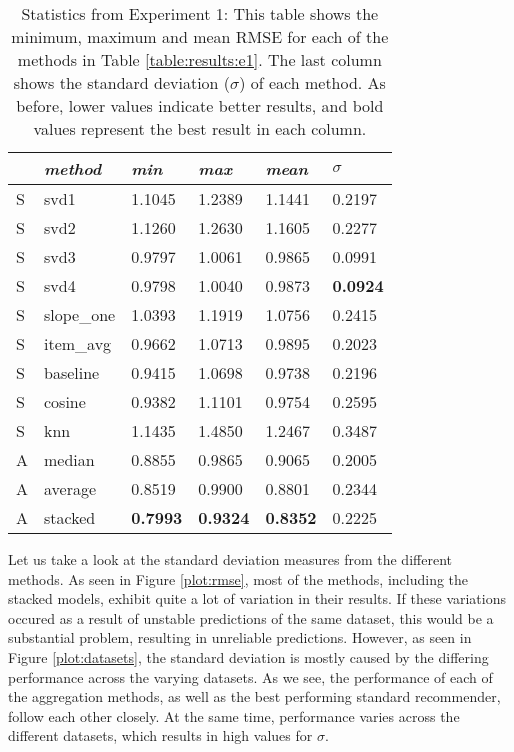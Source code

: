 \begin{table}
  \begin{tabular*}{\textwidth}{ l p{3cm} p{2cm} p{2cm} p{2cm} p{2cm} }
    \toprule
      ~ & \emph{method} & 
      \emph{min} & \emph{max} & \emph{mean} & $\sigma$\\
    \midrule
    S & svd1          & 1.1045	& 1.2389	& 1.1441	& 0.2197 \\
    S & svd2          & 1.1260	& 1.2630	& 1.1605	& 0.2277 \\
    S & svd3          & 0.9797	& 1.0061	& 0.9865	& 0.0991 \\
    S & svd4          & 0.9798	& 1.0040	& 0.9873	& \textbf{0.0924} \\
    S & slope\_one    & 1.0393	& 1.1919	& 1.0756	& 0.2415 \\
    S & item\_avg     & 0.9662	& 1.0713	& 0.9895	& 0.2023 \\
    S & baseline       & 0.9415	& 1.0698	& 0.9738	& 0.2196 \\
    S & cosine   	    & 0.9382	& 1.1101	& 0.9754	& 0.2595 \\
    S & knn       	  & 1.1435	& 1.4850	& 1.2467	& 0.3487 \\
    \midrule            
    A & median    	  & 0.8855	& 0.9865	& 0.9065	& 0.2005 \\
    A & average    	  & 0.8519	& 0.9900	& 0.8801	& 0.2344 \\
    A & stacked       & \textbf{0.7993}	& \textbf{0.9324}	& \textbf{0.8352}	& 0.2225 \\
    \bottomrule
  \end{tabular*}
  \caption[Statistics from Experiment 1]{
      Statistics from Experiment 1: 
      This table shows the minimum, maximum and mean RMSE for each of the methods in Table \ref{table:results:e1}.
      The last column shows the standard deviation ($\sigma$) of each method.
      As before, lower values indicate better results, and bold values
      represent the best result in each column.
    }
  \label{table:results:e1:sum}
\end{table}





Let us take a look at the standard deviation measures from the different methods.
As seen in Figure \ref{plot:rmse}, 
most of the methods, including the stacked models,
exhibit quite a lot of variation in their results.
If these variations occured as a result of unstable
predictions of the same dataset, this would be a substantial problem,
resulting in unreliable predictions.
However, as seen in Figure \ref{plot:datasets},
the standard deviation is mostly caused by the differing
performance across the varying datasets.
As we see, the performance of each of the aggregation methods,
as well as the best performing standard recommender,
follow each other closely. At the same time,
performance varies across the different datasets,
which results in high values for $\sigma$.


